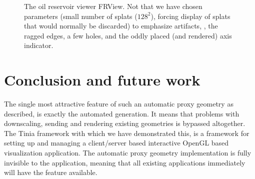 \begin{figure}[htb]
  \centering
  \caption{\label{fig:FRView}
           The oil reservoir viewer FRView. Not that we have chosen parameters
  (small number of splats ($128^2$), forcing display of splats that would normally be
  discarded) to emphasize artifacts, \eg, the ragged edges, a few holes, and the
  oddly placed (and rendered) axis indicator.}
\end{figure}


\section{Conclusion and future work}

The single most attractive feature of such an automatic proxy geometry as
described, is exactly the automated generation. It means that problems with
downscaling, sending and rendering existing geometries is bypassed
altogether. The Tinia framework with which we have demonstrated this, is a
framework for setting up and managing a client/server based interactive OpenGL
based visualization application. The automatic proxy geometry implementation is
fully invisible to the application, meaning that all existing applications
immediately will have the feature available.

